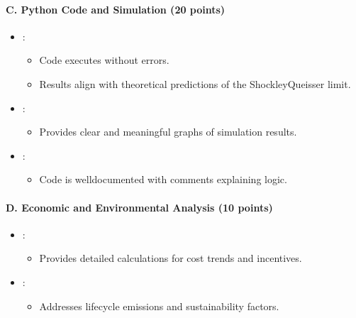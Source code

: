 \documentclass[letterpaper,10pt,english]{jupyterBook}
\begin{document}
\paragraph{C. Python Code and Simulation (20 points)}
\label{\detokenize{ProjectInstructions:c-python-code-and-simulation-20-points}}\begin{itemize}
\item {} 
\sphinxAtStartPar
{}:
\begin{itemize}
\item {} 
\sphinxAtStartPar
Code executes without errors.

\item {} 
\sphinxAtStartPar
Results align with theoretical predictions of the
Shockley\sphinxhyphen{}Queisser limit.

\end{itemize}

\item {} 
\sphinxAtStartPar
{}:
\begin{itemize}
\item {} 
\sphinxAtStartPar
Provides clear and meaningful graphs of simulation results.

\end{itemize}

\item {} 
\sphinxAtStartPar
{}:
\begin{itemize}
\item {} 
\sphinxAtStartPar
Code is well\sphinxhyphen{}documented with comments explaining logic.

\end{itemize}

\end{itemize}


\paragraph{D. Economic and Environmental Analysis (10 points)}
\label{\detokenize{ProjectInstructions:d-economic-and-environmental-analysis-10-points}}\begin{itemize}
\item {} 
\sphinxAtStartPar
{}:
\begin{itemize}
\item {} 
\sphinxAtStartPar
Provides detailed calculations for cost trends and incentives.

\end{itemize}

\item {} 
\sphinxAtStartPar
{}:
\begin{itemize}
\item {} 
\sphinxAtStartPar
Addresses lifecycle emissions and sustainability factors.

\end{itemize}

\end{itemize}
\end{document}
